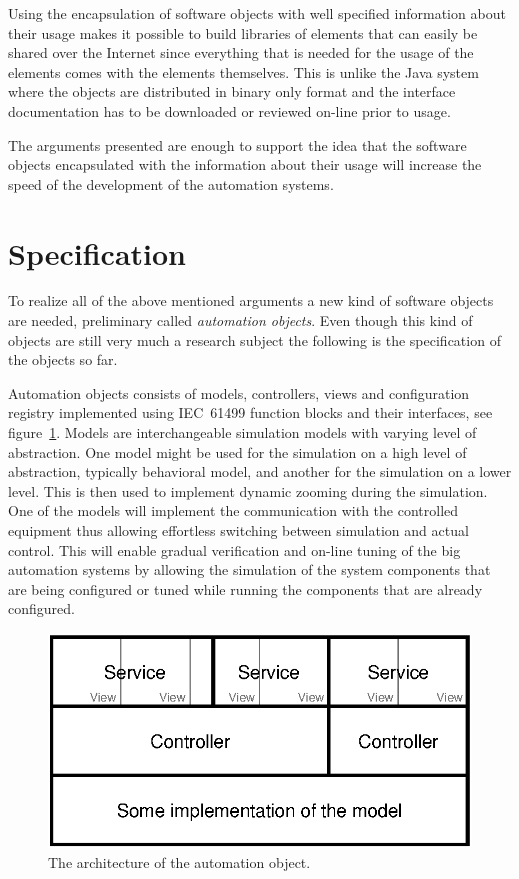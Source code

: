 Using the encapsulation of software objects with well
specified information about their usage makes it possible to
build libraries of elements that can easily be shared over
the Internet since everything that is needed for the usage
of the elements comes with the elements themselves. This is
unlike the Java system where the objects are distributed in
binary only format and the interface documentation has to be
downloaded or reviewed on-line prior to usage.

The arguments presented are enough to support the idea that
the software objects encapsulated with the information about
their usage will increase the speed of the development of
the automation systems.



\section{Specification}
To realize all of the above mentioned arguments a new kind
of software objects are needed, preliminary called
\emph{automation objects}. Even though this kind of objects
are still very much a research subject the following is the
specification of the objects so far.

Automation objects consists of models, controllers, views
and configuration registry implemented using IEC~61499
function blocks and their interfaces, see
figure~\ref{fig:AO}. Models are interchangeable simulation
models with varying level of abstraction. One model might
be used for the simulation on a high level of abstraction,
typically behavioral model, and another for the simulation
on a lower level. This is then used to implement dynamic
zooming during the simulation. One of the models will
implement the communication with the controlled equipment
thus allowing effortless switching between simulation and
actual control. This will enable gradual verification and
on-line tuning of the big automation systems by allowing the
simulation of the system components that are being
configured or tuned while running the components that are
already configured.
\begin{figure}[!ht]
  \centering
  \includegraphics{images/automationobjects/AO}
  \caption{The architecture of the automation object.}
  \label{fig:AO}
\end{figure}


